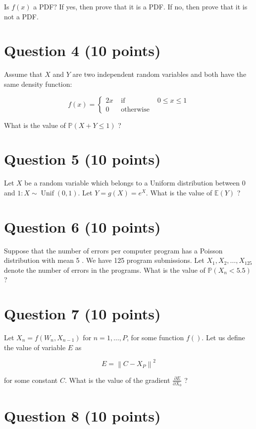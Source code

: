 Is $f(x)$ a PDF? If yes, then prove that it is a PDF. If no, then prove that it is not a PDF.

\section{Question 4 (10 points)}

Assume that $X$ and $Y$ are two independent random variables and both have the same density function:

$$
f(x)=\left\{\begin{array}{cl}
2 x & \text { if } & 0 \leq x \leq 1 \\
0 & \text { otherwise }
\end{array}\right.
$$

What is the value of $\mathbb{P}(X+Y \leq 1)$ ?

\section{Question 5 (10 points)}

Let $X$ be a random variable which belongs to a Uniform distribution between 0 and $1: X \sim \operatorname{Unif}(0,1)$. Let $Y=g(X)=e^{X}$. What is the value of $\mathbb{E}(Y)$ ?

\section{Question 6 (10 points)}

Suppose that the number of errors per computer program has a Poisson distribution with mean 5 . We have 125 program submissions. Let $X_{1}, X_{2}, \ldots, X_{125}$ denote the number of errors in the programs. What is the value of $\mathbb{P}\left(X_{n}<5.5\right)$ ?

\section{Question 7 (10 points)}

Let $X_{n}=f\left(W_{n}, X_{n-1}\right)$ for $n=1, \ldots, P$, for some function $f() .$ Let us define the value of variable $E$ as

$$
E=\left\|C-X_{P}\right\|^{2}
$$

for some constant $C$. What is the value of the gradient $\frac{\partial E}{\partial X_{0}}$ ?

\section{Question 8 (10 points)}

